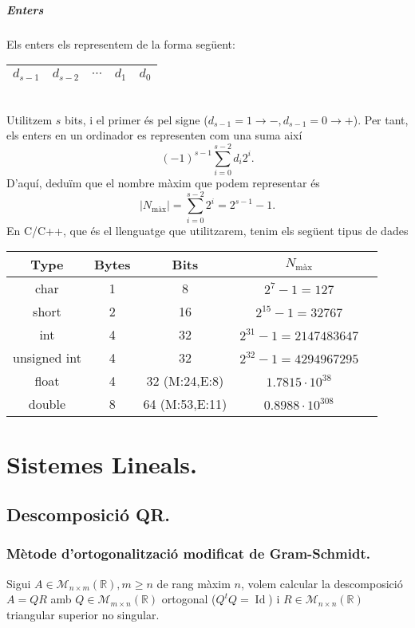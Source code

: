 \documentclass[11pt]{book}
\DeclareMathOperator{\idn}{Id}
\newcommand{\field}[1]{\mathbb{#1}}
\newcommand{\matr}[2]{\mathcal{M}_{#1\times#2}(\field{R})}
\begin{document}
\paragraph{Enters}
Els enters els representem de la forma següent:\\
\begin{table}[h!]
    \centering
    \begin{tabular}{ |c|c|c|c|c| }
        \hline
        $d_{s-1}$ & $d_{s-2}$ & $\cdots$ & $d_1$ & $d_0$\\
        \hline
    \end{tabular}
\end{table}\\
Utilitzem $s$ bits, i el primer és pel signe ($d_{s-1}=1\rightarrow-,d_{s-1}=0\rightarrow+$). Per tant, els enters en un ordinador es representen com una suma així
\[
(-1)^{s-1}\sum_{i=0}^{s-2}d_i2^i.
\]
D'aquí, deduïm que el nombre màxim que podem representar és
\[
|N_{\textrm{màx}}|=\sum_{i=0}^{s-2}2^i=2^{s-1}-1.
\]
En C/C++, que és el llenguatge que utilitzarem, tenim els següent tipus de dades
\begin{table}[h!]
    \centering
    \begin{tabular}{ |c|c|c|c|c| }
        \hline
        \textbf{Type} & \textbf{Bytes} & \textbf{Bits} & $N_{\textrm{màx}}$\\
        \hline
        char & 1 & 8 & $2^7-1=127$\\
        \hline
        short & 2 & 16 & $2^{15}-1=32767$\\
        \hline
        int & 4 & 32 & $2^{31}-1=2147483647$\\
        \hline
        unsigned int & 4 & 32 & $2^{32}-1=4294967295$\\
        \hline
        float & 4 & 32 (M:24,E:8) & $1.7815\cdot10^{38}$\\
        \hline
        double & 8 & 64 (M:53,E:11) & $0.8988\cdot10^{308}$\\
        \hline
    \end{tabular}
\end{table}
\newpage
\chapter{Sistemes Lineals.}
\section{Descomposició QR.}
\subsection{Mètode d'ortogonalització modificat de Gram-Schmidt.}
Sigui $A\in\matr{n}{m},m\geq n$ de rang màxim $n$, volem calcular la descomposició $A=QR$ amb $Q\in\matr{m}{n}$ ortogonal ($Q^tQ=\idn$) i $R\in\matr{n}{n}$ triangular superior no singular.
\end{document}
